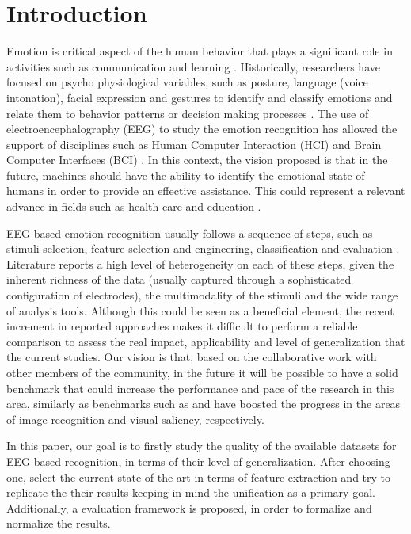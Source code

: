 \documentclass{sig-alternate}
\begin{document}
\section{Introduction}
Emotion is critical aspect of the human behavior that plays 
a  significant role in  activities such as communication and 
learning \cite{}.  Historically, researchers have focused on psycho 
physiological variables, such as posture, language 
(voice intonation), facial expression and gestures to identify 
and classify emotions and relate them to behavior patterns 
 or decision making processes \cite{}.
The use of electroencephalography (EEG) to study the 
emotion recognition  has allowed the 
support of disciplines such as Human Computer Interaction 
(HCI) and Brain Computer Interfaces (BCI) \cite{}. In this context, 
the vision proposed is that in the future, machines should 
have the ability to identify the emotional state of humans 
in order to provide an effective assistance. This could 
represent a relevant advance in fields such as health care 
and education \cite{}.

EEG-based emotion recognition usually follows a sequence 
of steps, such as  stimuli selection, feature selection and 
engineering, classification and evaluation \cite{}. Literature 
reports a high level of heterogeneity on each of these steps, 
given the inherent richness of the data (usually captured through 
a sophisticated configuration of electrodes), the multimodality 
of the stimuli and the wide range of analysis tools. Although 
this could be seen as a beneficial element, the recent increment
 in reported approaches makes it difficult to perform a reliable 
comparison to assess the real impact, applicability  and level 
of generalization that the current studies.  Our vision is that, 
based on the collaborative work with other members of the 
community, in the future it will be possible to have a solid 
benchmark that could increase the performance and pace 
of the research in this area, similarly as benchmarks such 
as  \cite{ILSVRC15} and \cite{Judd_2012} have boosted 
the progress in the areas of image recognition and visual 
saliency, respectively. 

In this paper, our  goal is to firstly  study the quality of 
the available datasets for EEG-based recognition, in 
terms of their level of generalization. After choosing 
one, select the current state of the art  in terms of feature
 extraction and try to replicate the their results keeping  
 in mind the unification as a primary goal. Additionally, a 
 evaluation framework is proposed, in order to formalize 
 and normalize the results.  
 
\end{document}
